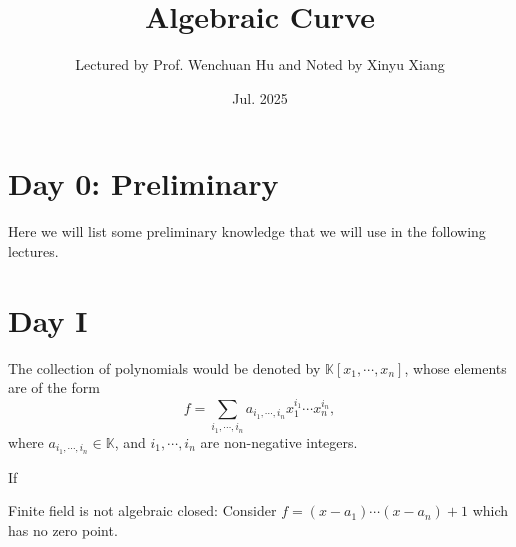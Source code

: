 \documentclass[10pt]{article}
\title{\textbf{Algebraic Curve}}
\author{Lectured by Prof. Wenchuan Hu and Noted by Xinyu Xiang}
\date{Jul. 2025}
\begin{document}
\maketitle

\section{Day 0: Preliminary}

Here we will list some preliminary knowledge that we will use in the following lectures.

\section{Day I}

%

\begin{definition}[Polynomial]
  The collection of polynomials would be denoted by $ \mathbb{K}[x_1,\cdots ,x_{n}]$, whose elements are of the form
  \begin{equation*}
    f = \sum_{i_1,\cdots ,i_n} a_{i_1,\cdots ,i_n} x_1^{i_1}\cdots x_n^{i_n},
  \end{equation*}
  where $ a_{i_1,\cdots ,i_n} \in \mathbb{K}$, and $ i_1,\cdots ,i_n$ are non-negative integers.
\end{definition}

\begin{definition}
  If
\end{definition}

\begin{remark}
  Finite field is not algebraic closed: Consider $ f = (x - a_{1}) \cdots (x - a_{n}) + 1$ which has no zero point.
\end{remark}
\end{document}
